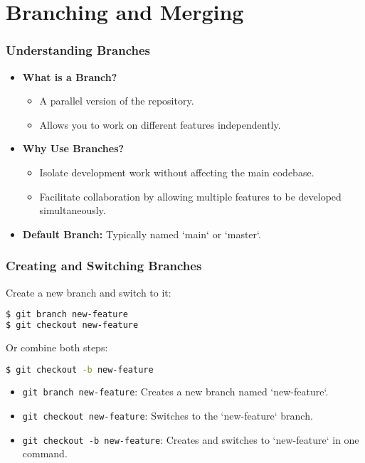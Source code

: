 \documentclass{beamer}
\begin{document}
\section{Branching and Merging}

\begin{frame}
  \frametitle{Understanding Branches}
  \begin{itemize}
    \item \textbf{What is a Branch?}
      \begin{itemize}
        \item A parallel version of the repository.
        \item Allows you to work on different features independently.
      \end{itemize}
    \item \textbf{Why Use Branches?}
      \begin{itemize}
        \item Isolate development work without affecting the main codebase.
        \item Facilitate collaboration by allowing multiple features to be developed simultaneously.
      \end{itemize}
    \item \textbf{Default Branch:} Typically named `main` or `master`.
  \end{itemize}
\end{frame}

\begin{frame}[fragile]
  \frametitle{Creating and Switching Branches}
  Create a new branch and switch to it:
  \begin{lstlisting}[language=bash]
$ git branch new-feature
$ git checkout new-feature
  \end{lstlisting}
  Or combine both steps:
  \begin{lstlisting}[language=bash]
$ git checkout -b new-feature
  \end{lstlisting}
  \begin{itemize}
    \item \texttt{git branch new-feature}: Creates a new branch named `new-feature`.
    \item \texttt{git checkout new-feature}: Switches to the `new-feature` branch.
    \item \texttt{git checkout -b new-feature}: Creates and switches to `new-feature` in one command.
  \end{itemize}
\end{frame}
\end{document}
